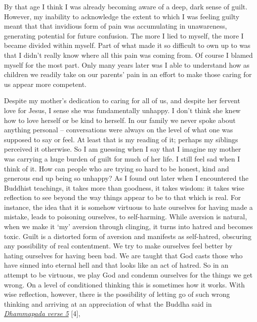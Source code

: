 By that age I think I was already becoming aware of a deep, dark sense
of guilt. However, my inability to acknowledge the extent to which I was
feeling guilty meant that that invidious form of pain was accumulating
in unawareness, generating potential for future confusion. The more I
lied to myself, the more I became divided within myself. Part of what
made it so difficult to own up to was that I didn't really know where
all this pain was coming from. Of course I blamed myself for the most
part. Only many years later was I able to understand how as children we
readily take on our parents' pain in an effort to make those caring for
us appear more competent.

Despite my mother's dedication to caring for all of us, and despite her
fervent love for Jesus, I sense she was fundamentally unhappy. I don't
think she knew how to love herself or be kind to herself. In our family
we never spoke about anything personal -- conversations were always on
the level of what one was supposed to say or feel. At least that is my
reading of it; perhaps my siblings perceived it otherwise. So I am
guessing when I say that I imagine my mother was carrying a huge burden
of guilt for much of her life. I still feel sad when I think of it. How
can people who are trying so hard to be honest, kind and generous end up
being so unhappy? As I found out later when I encountered the Buddhist
teachings, it takes more than goodness, it takes wisdom: it takes wise
reflection to see beyond the way things appear to be to that which is
real. For instance, the idea that it is somehow virtuous to hate
ourselves for having made a mistake, leads to poisoning ourselves, to
self-harming. While aversion is natural, when we make it `my' aversion
through clinging, it turns into hatred and becomes toxic. Guilt is a
distorted form of aversion and manifests as self-hatred, obscuring any
possibility of real contentment. We try to make ourselves feel better by
hating ourselves for having been bad. We are taught that God casts those
who have sinned into eternal hell and that looks like an act of hatred.
So in an attempt to be virtuous, we play God and condemn ourselves for
the things we get wrong. On a level of conditioned thinking this is
sometimes how it works. With wise reflection, however, there is the
possibility of letting go of such wrong thinking and arriving at an
appreciation of what the Buddha said in
\href{https://forestsangha.org/teachings/books/a-dhammapada-for-contemplation?language=English}{\emph{\underline{Dhammapada
verse 5}}} {[}4{]},

